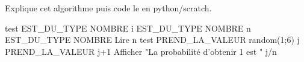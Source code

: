 
Explique cet algorithme puis code le en python/scratch.

\begin{algobox}
\Variables
\Ligne test EST\_DU\_TYPE NOMBRE
\Ligne i EST\_DU\_TYPE NOMBRE
\Ligne n EST\_DU\_TYPE NOMBRE
\DebutAlgo
\Ligne Lire n
\DebutPour
\Ligne test PREND\_LA\_VALEUR random(1;6)
\DebutSi
\Ligne j PREND\_LA\_VALEUR j+1
\FinSi
\FinPour
\Ligne Afficher "La probabilité d'obtenir 1 est "
\Ligne j/n
\FinAlgo
\end{algobox}